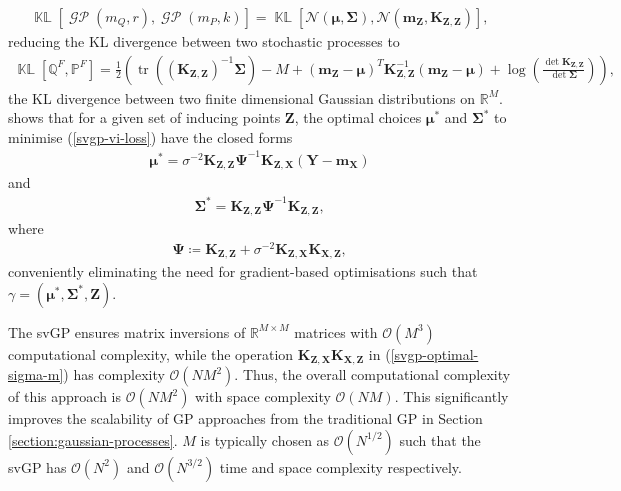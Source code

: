 \documentclass{article}
\newcommand{\KLD}{\operatorname{\mathbb{KL}}}
\newcommand{\tr}{\operatorname{tr}}
\newcommand{\GP}{\operatorname{\mathcal{GP}}}
\numberwithin{equation}{section}
\begin{document}
\begin{align}
    \KLD\left[\GP\left(m_Q, r\right), \GP\left(m_P, k\right)\right] = \KLD\left[\mathcal{N}\left(\boldsymbol{\mu}, \mathbf{\Sigma}\right), \mathcal{N}\left(\mathbf{m}_{\mathbf{Z}}, \mathbf{K}_{\mathbf{Z}, \mathbf{Z}}\right)\right],
\end{align}
reducing the KL divergence between two stochastic processes to
\begin{align}
        \KLD\left[\mathbb{Q}^F, \mathbb{P}^F\right]
    = \frac{1}{2}\left( \tr\left(\left(\mathbf{K}_{\mathbf{Z}, \mathbf{Z}}\right)^{-1} \boldsymbol{\Sigma}\right) - M +
    \left(\mathbf{m}_{\mathbf{Z}} - \boldsymbol{\mu}\right)^T \mathbf{K}_{\mathbf{Z}, \mathbf{Z}}^{-1} \left(\mathbf{m}_{\mathbf{Z}} - \boldsymbol{\mu}\right)+ \log\left(\frac{\det\mathbf{K}_{\mathbf{Z}, \mathbf{Z}}}{\det\boldsymbol{\Sigma}}\right) \right),
    \label{kld-closed-form}
\end{align}
the KL divergence between two finite dimensional Gaussian distributions on $\mathbb{R}^M$.
\cite{titsias2009variational} shows that for a given set of inducing points $\mathbf{Z}$, the optimal choices $\boldsymbol{\mu}^*$ and $\mathbf{\Sigma}^*$ to minimise (\ref{svgp-vi-loss}) have the closed forms
\begin{align}
    \label{svgp-optimal-mean}
    \boldsymbol{\mu}^* = \sigma^{-2}\mathbf{K}_{\mathbf{Z}, \mathbf{Z}} \mathbf{\Psi}^{-1}\mathbf{K}_{\mathbf{Z}, \mathbf{X}}  \left(\mathbf{Y} - \mathbf{m}_\mathbf{X}\right)
\end{align}
and
\begin{align}
    \label{svgp-optimal-covariance}
    \mathbf{\Sigma}^* = \mathbf{K}_{\mathbf{Z}, \mathbf{Z}}  \mathbf{\Psi}^{-1}\mathbf{K}_{\mathbf{Z}, \mathbf{Z}},
\end{align}
where
\begin{align}
    \mathbf{\Psi} \coloneqq \mathbf{K}_{\mathbf{Z}, \mathbf{Z}}  + \sigma^{-2}\mathbf{K}_{\mathbf{Z}, \mathbf{X}} \mathbf{K}_{\mathbf{X}, \mathbf{Z}},
    \label{svgp-optimal-sigma-m}
\end{align}
conveniently eliminating the need for gradient-based optimisations such that $\gamma = \left(\boldsymbol{\mu}^*, \mathbf{\Sigma}^*,  \mathbf{Z}\right)$.

The svGP ensures matrix inversions of $\mathbb{R}^{M \times M}$ matrices with $\mathcal{O}\left(M^3\right)$ computational complexity, while the operation $\mathbf{K}_{\mathbf{Z}, \mathbf{X}} \mathbf{K}_{\mathbf{X}, \mathbf{Z}}$ in (\ref{svgp-optimal-sigma-m}) has complexity $\mathcal{O}\left(NM^2\right)$.
Thus, the overall computational complexity of this approach is $\mathcal{O}\left(NM^2\right)$ with space complexity $\mathcal{O}\left(NM\right)$.
This significantly improves the scalability of GP approaches from the traditional GP in Section \ref{section:gaussian-processes}. $M$ is typically chosen as $\mathcal{O}(N^{1/2})$ such that the svGP has $\mathcal{O}(N^{2})$ and $\mathcal{O}(N^{3/2})$ time and space complexity respectively.
\end{document}
